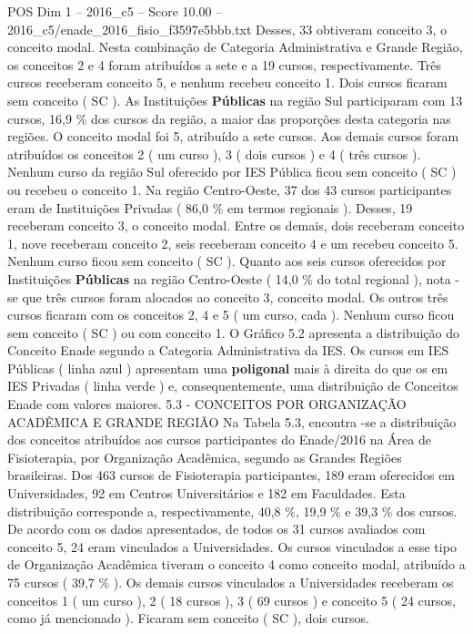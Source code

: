 \begin{textsample}{POS Dim 1 – 2016\_c5 – Score 10.00 – 2016\_c5/enade\_2016\_fisio\_f3597e5bbb.txt}
Desses, 33 obtiveram conceito 3, o conceito modal.
Nesta combinação de Categoria Administrativa e Grande Região, os conceitos 2 e 4 foram atribuídos a sete e a 19 cursos, respectivamente.
Três cursos receberam conceito 5, e nenhum recebeu conceito 1.
Dois cursos ficaram sem conceito ( SC ).
As Instituições \textbf{Públicas} na região Sul participaram com 13 cursos, 16,9 \% dos cursos da região, a maior das proporções desta categoria nas regiões.
O conceito modal foi 5, atribuído a sete cursos.
Aos demais cursos foram atribuídos os conceitos 2 ( um curso ), 3 ( dois cursos ) e 4 ( três cursos ).
Nenhum curso da região Sul oferecido por IES Pública ficou sem conceito ( SC ) ou recebeu o conceito 1.
Na região Centro-Oeste, 37 dos 43 cursos participantes eram de Instituições Privadas ( 86,0 \% em termos regionais ).
Desses, 19 receberam conceito 3, o conceito modal.
Entre os demais, dois receberam conceito 1, nove receberam conceito 2, seis receberam conceito 4 e um recebeu conceito 5.
Nenhum curso ficou sem conceito ( SC ).
Quanto aos seis cursos oferecidos por Instituições \textbf{Públicas} na região Centro-Oeste ( 14,0 \% do total regional ), nota -se que três cursos foram alocados ao conceito 3, conceito modal.
Os outros três cursos ficaram com os conceitos 2, 4 e 5 ( um curso, cada ).
Nenhum curso ficou sem conceito ( SC ) ou com conceito 1.
O Gráfico 5.2 apresenta a distribuição do Conceito Enade segundo a Categoria Administrativa da IES.
Os cursos em IES Públicas ( linha azul ) apresentam uma \textbf{poligonal} mais à direita do que os em IES Privadas ( linha verde ) e, consequentemente, uma distribuição de Conceitos Enade com valores maiores. 5.3 - CONCEITOS POR ORGANIZAÇÃO ACADÊMICA E GRANDE REGIÃO Na Tabela 5.3, encontra -se a distribuição dos conceitos atribuídos aos cursos participantes do Enade/2016 na Área de Fisioterapia, por Organização Acadêmica, segundo as Grandes Regiões brasileiras.
Dos 463 cursos de Fisioterapia participantes, 189 eram oferecidos em Universidades, 92 em Centros Universitários e 182 em Faculdades.
Esta distribuição corresponde a, respectivamente, 40,8 \%, 19,9 \% e 39,3 \% dos cursos.
De acordo com os dados apresentados, de todos os 31 cursos avaliados com conceito 5, 24 eram vinculados a Universidades.
Os cursos vinculados a esse tipo de Organização Acadêmica tiveram o conceito 4 como conceito modal, atribuído a 75 cursos ( 39,7 \% ).
Os demais cursos vinculados a Universidades receberam os conceitos 1 ( um curso ), 2 ( 18 cursos ), 3 ( 69 cursos ) e conceito 5 ( 24 cursos, como já mencionado ).
Ficaram sem conceito ( SC ), dois cursos.

\end{textsample}
